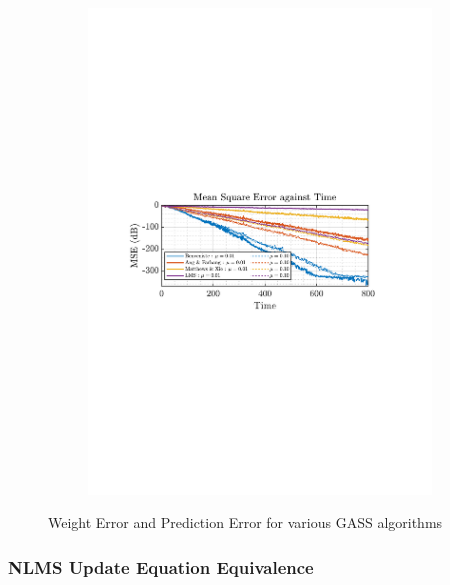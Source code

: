 \documentclass[12pt]{article}
\begin{document}
\begin{figure}[H]
\begin{subfigure}{0.49\textwidth}
					\includegraphics[trim={2.2cm 11.2cm 3.15cm  11.2cm}, clip, width=\textwidth]{../MATLAB/figures/q2_2a_fig04.pdf} 
					\captionsetup{justification=centering}
				\end{subfigure}
				\captionsetup{justification=centering}
				\caption{Weight Error and Prediction Error for various GASS algorithms}
				\label{fig: 2-2a}
			\end{figure}
		\subsubsection{NLMS Update Equation Equivalence} 
\end{document}
